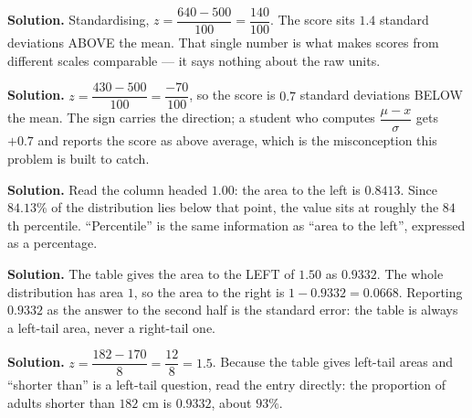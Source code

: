 \documentclass[12pt]{article}
\begin{document}



\textbf{Solution.} Standardising, $z = \dfrac{640 - 500}{100} = \dfrac{140}{100}$. The score sits $1.4$ standard deviations ABOVE the mean. That single number is what makes scores from different scales comparable --- it says nothing about the raw units.



\textbf{Solution.} $z = \dfrac{430 - 500}{100} = \dfrac{-70}{100}$, so the score is $0.7$ standard deviations BELOW the mean. The sign carries the direction; a student who computes $\dfrac{\mu - x}{\sigma}$ gets $+0.7$ and reports the score as above average, which is the misconception this problem is built to catch.



\textbf{Solution.} Read the column headed $1.00$: the area to the left is $0.8413$. Since $84.13\%$ of the distribution lies below that point, the value sits at roughly the $84$th percentile. ``Percentile'' is the same information as ``area to the left'', expressed as a percentage.



\textbf{Solution.} The table gives the area to the LEFT of $1.50$ as $0.9332$. The whole distribution has area $1$, so the area to the right is $1 - 0.9332 = 0.0668$. Reporting $0.9332$ as the answer to the second half is the standard error: the table is always a left-tail area, never a right-tail one.



\textbf{Solution.} $z = \dfrac{182 - 170}{8} = \dfrac{12}{8} = 1.5$. Because the table gives left-tail areas and ``shorter than'' is a left-tail question, read the entry directly: the proportion of adults shorter than $182$ cm is $0.9332$, about $93\%$.
\end{document}
